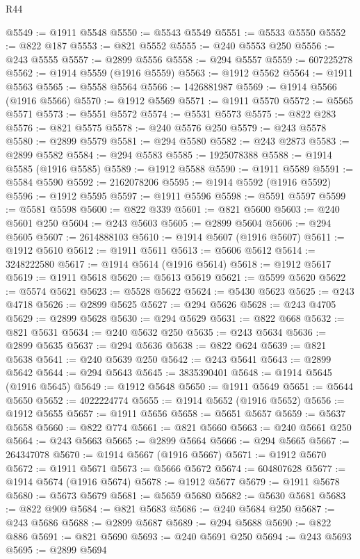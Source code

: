 \begin{lexlean}{R44}
\begin{coremodule}
{@5549 := @1911 @5548
@5550 := @5543 @5549
@5551 := @5533 @5550
@5552 := @822 @187
@5553 := @821 @5552
@5555 := @240 @5553 @250
@5556 := @243 @5555
@5557 := @2899 @5556
@5558 := @294 @5557
@5559 := 607225278
@5562 := @1914 @5559 (@1916 @5559)
@5563 := @1912 @5562
@5564 := @1911 @5563
@5565 := @5558 @5564
@5566 := 1426881987
@5569 := @1914 @5566 (@1916 @5566)
@5570 := @1912 @5569
@5571 := @1911 @5570
@5572 := @5565 @5571
@5573 := @5551 @5572
@5574 := @5531 @5573
@5575 := @822 @283
@5576 := @821 @5575
@5578 := @240 @5576 @250
@5579 := @243 @5578
@5580 := @2899 @5579
@5581 := @294 @5580
@5582 := @243 @2873
@5583 := @2899 @5582
@5584 := @294 @5583
@5585 := 1925078388
@5588 := @1914 @5585 (@1916 @5585)
@5589 := @1912 @5588
@5590 := @1911 @5589
@5591 := @5584 @5590
@5592 := 2162078206
@5595 := @1914 @5592 (@1916 @5592)
@5596 := @1912 @5595
@5597 := @1911 @5596
@5598 := @5591 @5597
@5599 := @5581 @5598
@5600 := @822 @339
@5601 := @821 @5600
@5603 := @240 @5601 @250
@5604 := @243 @5603
@5605 := @2899 @5604
@5606 := @294 @5605
@5607 := 2614888103
@5610 := @1914 @5607 (@1916 @5607)
@5611 := @1912 @5610
@5612 := @1911 @5611
@5613 := @5606 @5612
@5614 := 3248222580
@5617 := @1914 @5614 (@1916 @5614)
@5618 := @1912 @5617
@5619 := @1911 @5618
@5620 := @5613 @5619
@5621 := @5599 @5620
@5622 := @5574 @5621
@5623 := @5528 @5622
@5624 := @5430 @5623
@5625 := @243 @4718
@5626 := @2899 @5625
@5627 := @294 @5626
@5628 := @243 @4705
@5629 := @2899 @5628
@5630 := @294 @5629
@5631 := @822 @668
@5632 := @821 @5631
@5634 := @240 @5632 @250
@5635 := @243 @5634
@5636 := @2899 @5635
@5637 := @294 @5636
@5638 := @822 @624
@5639 := @821 @5638
@5641 := @240 @5639 @250
@5642 := @243 @5641
@5643 := @2899 @5642
@5644 := @294 @5643
@5645 := 3835390401
@5648 := @1914 @5645 (@1916 @5645)
@5649 := @1912 @5648
@5650 := @1911 @5649
@5651 := @5644 @5650
@5652 := 4022224774
@5655 := @1914 @5652 (@1916 @5652)
@5656 := @1912 @5655
@5657 := @1911 @5656
@5658 := @5651 @5657
@5659 := @5637 @5658
@5660 := @822 @774
@5661 := @821 @5660
@5663 := @240 @5661 @250
@5664 := @243 @5663
@5665 := @2899 @5664
@5666 := @294 @5665
@5667 := 264347078
@5670 := @1914 @5667 (@1916 @5667)
@5671 := @1912 @5670
@5672 := @1911 @5671
@5673 := @5666 @5672
@5674 := 604807628
@5677 := @1914 @5674 (@1916 @5674)
@5678 := @1912 @5677
@5679 := @1911 @5678
@5680 := @5673 @5679
@5681 := @5659 @5680
@5682 := @5630 @5681
@5683 := @822 @909
@5684 := @821 @5683
@5686 := @240 @5684 @250
@5687 := @243 @5686
@5688 := @2899 @5687
@5689 := @294 @5688
@5690 := @822 @886
@5691 := @821 @5690
@5693 := @240 @5691 @250
@5694 := @243 @5693
@5695 := @2899 @5694
}
\end{coremodule}
\end{lexlean}
